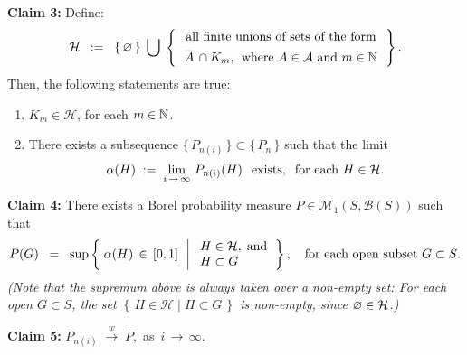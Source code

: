 \vskip 0.5cm
\begin{center}
\begin{minipage}{6.5in}
\textbf{Claim 3:}\quad
Define:
\begin{equation*}
\mathcal{H}
\;\; := \;\;
\left\{\,\varemptyset\,\right\}
\;\bigcup\;
\left\{\,
\begin{array}{c}
\textnormal{all finite unions of sets of the form}
\\
\textnormal{$\overline{A}\,\overset{{\color{white}1}}{\cap}K_{m}$, \;where $A \in \mathcal{A}$ and $m \in \N$}
\end{array}
\,\right\}.
\end{equation*}
Then, the following statements are true:
\begin{enumerate}
\item	$K_{m} \in \mathcal{H}$, for each $m \in \mathbb{N}$.
\item	There exists a subsequence $\{\,P_{n(i)}\,\} \subset \{\,P_{n}\,\}$ such that the limit
		\begin{equation*}
		\alpha(H) \; := \;
		\lim_{i\,\rightarrow\,\infty}\,P_{n(i)}(H) \;\;\,\textnormal{exists},
		\;\;
		\textnormal{for each $H \in \mathcal{H}$}.
		\end{equation*}
\end{enumerate}
\end{minipage}
\end{center}

\vskip 0.5cm
\begin{center}
\begin{minipage}{6.5in}
\textbf{Claim 4:}\quad
There exists a Borel probability measure $P \in \mathcal{M}_{1}(S,\mathcal{B}(S))$ such that
\begin{equation*}
P(G)
\;\; = \;\;
\sup\left\{\;
\alpha(H) \,\in\, [0,1]
\,\;\left\vert\;
\begin{array}{l} H \in \mathcal{H}, \;\textnormal{and} \\ H \subset G \end{array}
\right.
\right\},
\quad
\textnormal{for each open subset $G \subset S$}.
\end{equation*}
\textit{\small(Note that the supremum above is always taken over a non-empty set: For each open $G \subset S$,
the set $\left\{\,H \in \mathcal{H}\;\vert\;H \subset G\,\right\}$ is non-empty, since $\varnothing \in \mathcal{H}$.)}
\end{minipage}
\end{center}

\vskip 0.5cm
\begin{center}
\begin{minipage}{6.5in}
\textbf{Claim 5:}\quad
$P_{n(i)} \;\overset{w}{\longrightarrow}\; P$,\,
as \,$i\,\longrightarrow\,\infty$.
\end{minipage}
\end{center}

